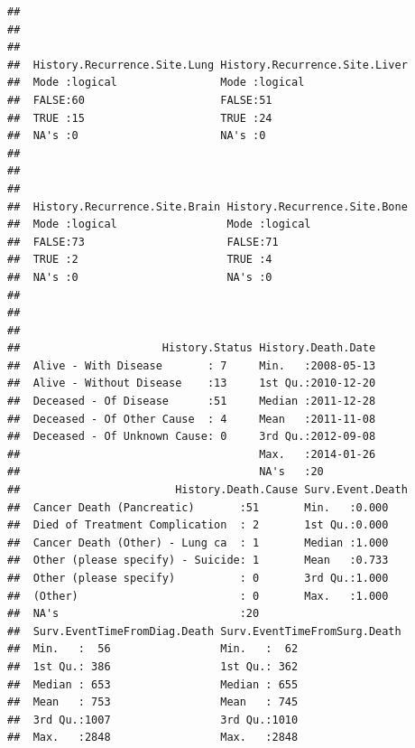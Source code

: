 \documentclass{article}\usepackage[]{graphicx}\usepackage[]{color}
\makeatletter
\newenvironment{kframe}{%
 \def\at@end@of@kframe{}%
 \ifinner\ifhmode%
  \def\at@end@of@kframe{\end{minipage}}%
  \begin{minipage}{\columnwidth}%
 \fi\fi%
 \def\FrameCommand##1{\hskip\@totalleftmargin \hskip-\fboxsep
 \colorbox{shadecolor}{##1}\hskip-\fboxsep
     \hskip-\linewidth \hskip-\@totalleftmargin \hskip\columnwidth}%
 \MakeFramed {\advance\hsize-\width
   \@totalleftmargin\z@ \linewidth\hsize
   \@setminipage}}%
 {\par\unskip\endMakeFramed%
 \at@end@of@kframe}
\newenvironment{knitrout}{}{} %
\makeatother
\begin{document}
\begin{knitrout}
\begin{kframe}
\begin{verbatim}
##                                                                      
##                                                                      
##                                                                      
##  History.Recurrence.Site.Lung History.Recurrence.Site.Liver
##  Mode :logical                Mode :logical                
##  FALSE:60                     FALSE:51                     
##  TRUE :15                     TRUE :24                     
##  NA's :0                      NA's :0                      
##                                                            
##                                                            
##                                                            
##  History.Recurrence.Site.Brain History.Recurrence.Site.Bone
##  Mode :logical                 Mode :logical               
##  FALSE:73                      FALSE:71                    
##  TRUE :2                       TRUE :4                     
##  NA's :0                       NA's :0                     
##                                                            
##                                                            
##                                                            
##                      History.Status History.Death.Date  
##  Alive - With Disease       : 7     Min.   :2008-05-13  
##  Alive - Without Disease    :13     1st Qu.:2010-12-20  
##  Deceased - Of Disease      :51     Median :2011-12-28  
##  Deceased - Of Other Cause  : 4     Mean   :2011-11-08  
##  Deceased - Of Unknown Cause: 0     3rd Qu.:2012-09-08  
##                                     Max.   :2014-01-26  
##                                     NA's   :20          
##                        History.Death.Cause Surv.Event.Death
##  Cancer Death (Pancreatic)       :51       Min.   :0.000   
##  Died of Treatment Complication  : 2       1st Qu.:0.000   
##  Cancer Death (Other) - Lung ca  : 1       Median :1.000   
##  Other (please specify) - Suicide: 1       Mean   :0.733   
##  Other (please specify)          : 0       3rd Qu.:1.000   
##  (Other)                         : 0       Max.   :1.000   
##  NA's                            :20                       
##  Surv.EventTimeFromDiag.Death Surv.EventTimeFromSurg.Death
##  Min.   :  56                 Min.   :  62                
##  1st Qu.: 386                 1st Qu.: 362                
##  Median : 653                 Median : 655                
##  Mean   : 753                 Mean   : 745                
##  3rd Qu.:1007                 3rd Qu.:1010                
##  Max.   :2848                 Max.   :2848                

\end{verbatim}
\end{kframe}
\end{knitrout}
\end{document}

